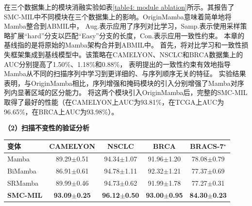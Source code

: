 在三个数据集上的模块消融实验如表\ref{table4: module ablation}所示。其报告了SMC-MIL中不同模块在三个数据集上的影响。OriginMamba意味着简单地将Mamba整合到ABMIL中，
Aug.表示应用了序列对比学习，Samp.表示使用采样策略扩展“hard”分支以匹配“Easy”分支的长度，Con.表示应用一致性约束。
本章的基线指的是将原始的Mamba架构合并到ABMIL中。
首先，将对比学习和一致性损失框架集成到基线模型中。该策略在CAMELYON、NSCLC和BRCA数据集上的AUC分别提高了1.50\%、1.18\%和0.88\%，
表明提出的一致性约束有效地指导Mamba从不同的扫描序列中学习到更详细的、与序列顺序无关的特征。
实验结果表明，与OriginMamba相比，序列增强和掩码模块的引入分别增强了Mamba对序列内显著区域的区分能力。
将这两个模块引入OriginMamba后，完整的SMC-MIL取得了最好的性能（在CAMELYON上AUC为93.81\%，在TCGA上AUC为96.65\%，在BRCA上AUC为93.98\%）。



\textbf{（2）扫描不变性的验证分析}

\begin{table}[h!]
  \large    %
  \centering
  \begin{tabularx}{\textwidth}{lCCCC}
    \toprule
    变体 & CAMELYON& NSCLC&BRCA& BRACS-7$^\star$\\ \midrule
Mamba &  89.29$\pm$0.51& 94.34$\pm$1.07 & 91.96$\pm$1.20& 78.08$\pm$0.79 \\
BiMamba  & 86.91$\pm$0.61&  94.78$\pm$1.11 & 92.32$\pm$1.21&77.37$\pm$0.69 \\
SRMamba  & 89.99$\pm$0.46& 94.73$\pm$0.62 &91.99$\pm$1.78& 77.27$\pm$0.31\\
\textbf{SMC-MIL} &\textbf{93.09$\pm$0.25}&\textbf{96.12$\pm$0.50}  &\textbf{93.00$\pm$0.95}&\textbf{84.30$\pm$0.23}\\
    \bottomrule
  \end{tabularx}
  \label{table4: scan-invariant}
\end{table}

